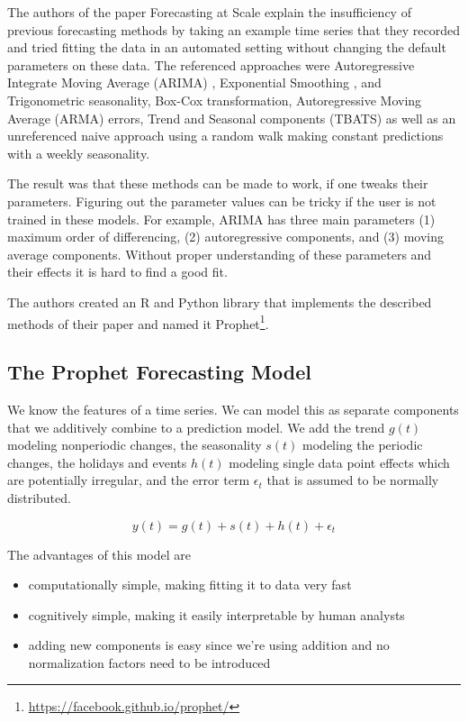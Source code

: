 The authors of the paper Forecasting at Scale \cite{b1} explain the insufficiency of previous forecasting methods by taking an example time series that they recorded and tried fitting the data in an automated setting without changing the default parameters on these data. The referenced approaches were Autoregressive Integrate Moving Average (ARIMA) \cite{b2}, Exponential Smoothing \cite{b3}, and Trigonometric seasonality, Box-Cox transformation, Autoregressive Moving Average (ARMA) errors, Trend and Seasonal components (TBATS) \cite{b4} as well as an unreferenced naive approach using a random walk making constant predictions with a weekly seasonality.

The result was that these methods can be made to work, if one tweaks their parameters. Figuring out the parameter values can be tricky if the user is not trained in these models. For example, ARIMA has three main parameters (1) maximum order of differencing, (2) autoregressive components, and (3) moving average components. Without proper understanding of these parameters and their effects it is hard to find a good fit.

The authors created an R and Python library that implements the described methods of their paper and named it Prophet\footnote{\href{https://facebook.github.io/prophet/}{https://facebook.github.io/prophet/}}.

\subsection{The Prophet Forecasting Model}

We know the features of a time series. We can model this as separate components that we additively combine to a prediction model. We add the trend \(g(t)\) modeling nonperiodic changes, the seasonality \(s(t)\) modeling the periodic changes, the holidays and events \(h(t)\) modeling single data point effects which are potentially irregular, and the error term \(\epsilon_t\) that is assumed to be normally distributed.


\begin{equation}
    y(t)=g(t)+s(t)+h(t)+\epsilon_t
    \label{eq:fullTrendModel}
\end{equation}


The advantages of this model are 

\begin{itemize}
    \item computationally simple, making fitting it to data very fast
    \item cognitively simple, making it easily interpretable by human analysts
    \item adding new components is easy since we're using addition and no normalization factors need to be introduced
\end{itemize}



